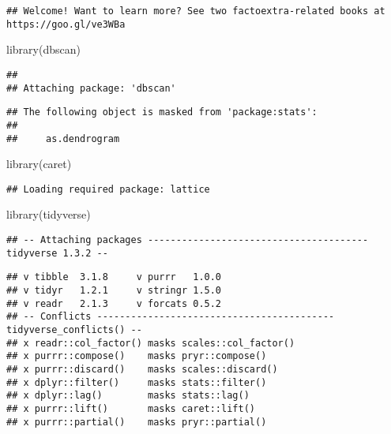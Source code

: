 \documentclass[
]{article}
\newenvironment{Shaded}{\begin{snugshade}}{\end{snugshade}}
\newcommand{\FunctionTok}[1]{\textcolor[rgb]{0.00,0.00,0.00}{#1}}
\newcommand{\NormalTok}[1]{#1}
\begin{document}
\begin{verbatim}
## Welcome! Want to learn more? See two factoextra-related books at https://goo.gl/ve3WBa
\end{verbatim}

\begin{Shaded}
\begin{Highlighting}[]
\FunctionTok{library}\NormalTok{(dbscan)}
\end{Highlighting}
\end{Shaded}

\begin{verbatim}
## 
## Attaching package: 'dbscan'
\end{verbatim}

\begin{verbatim}
## The following object is masked from 'package:stats':
## 
##     as.dendrogram
\end{verbatim}

\begin{Shaded}
\begin{Highlighting}[]
\FunctionTok{library}\NormalTok{(caret)}
\end{Highlighting}
\end{Shaded}

\begin{verbatim}
## Loading required package: lattice
\end{verbatim}

\begin{Shaded}
\begin{Highlighting}[]
\FunctionTok{library}\NormalTok{(tidyverse)}
\end{Highlighting}
\end{Shaded}

\begin{verbatim}
## -- Attaching packages --------------------------------------- tidyverse 1.3.2 --
\end{verbatim}

\begin{verbatim}
## v tibble  3.1.8     v purrr   1.0.0
## v tidyr   1.2.1     v stringr 1.5.0
## v readr   2.1.3     v forcats 0.5.2
## -- Conflicts ------------------------------------------ tidyverse_conflicts() --
## x readr::col_factor() masks scales::col_factor()
## x purrr::compose()    masks pryr::compose()
## x purrr::discard()    masks scales::discard()
## x dplyr::filter()     masks stats::filter()
## x dplyr::lag()        masks stats::lag()
## x purrr::lift()       masks caret::lift()
## x purrr::partial()    masks pryr::partial()
\end{verbatim}
\end{document}
